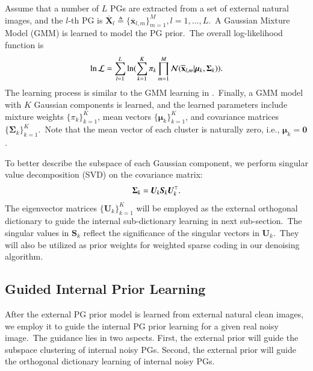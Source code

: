 Assume that a number of $L$ PGs are extracted from a set of external natural images, and the $l$-th PG is $\mathbf{\overline{X}}_{l}\triangleq \{\mathbf{\overline{x}}_{l,m}\}_{m=1}^{M}, l=1,...,L$.\ A Gaussian Mixture Model (GMM) is learned to model the PG prior.\ The overall log-likelihood function is
\vspace{-2mm}
\begin{equation}\label{equ3-1}
\vspace{-2mm}
\begin{split}
\ln\mathcal{L}=\sum_{l=1}^{L} \ln(\sum_{k=1}^{K}\pi_{k}\prod_{m=1}^{M}\mathcal{N}(\mathbf{\overline{x}}_{l,m}|\bm{\mu}_{k},\bm{\Sigma}_{k})).
\end{split}
\end{equation}
The learning process is similar to the GMM learning in \cite{pgpd,epll}.\ Finally, a GMM model with $K$ Gaussian components is learned, and the learned parameters include mixture weights $\{\pi_{k}\}_{k=1}^{K}$, mean vectors $\{\bm{\mu}_{k}\}_{k=1}^{K}$, and covariance matrices $\{\bm{\Sigma}_{k}\}_{k=1}^{K}$.\ Note that the mean vector of each cluster is naturally zero, i.e., $\bm{\mu}_{k}=\bm{0}$.  

To better describe the subspace of each Gaussian component, we perform singular value decomposition (SVD) \cite{eckart1936approximation} on the covariance matrix:
\vspace{-2mm}
\begin{equation}\label{equ3-2}
\vspace{-2mm}
\bm{\Sigma}_{k}=\bm{U}_{k}\bm{S}_{k}\bm{U}_{k}^{\top}.
\end{equation}
The eigenvector matrices $\{\bm{U}_{k}\}_{k=1}^{K}$ will be employed as the external orthogonal dictionary to guide the internal sub-dictionary learning in next sub-section.\ The singular values in $\bm{S}_{k}$ reflect the significance of the singular vectors in $\bm{U}_{k}$.\ They  will also be utilized as prior weights for weighted sparse coding in our denoising algorithm.


\subsection{Guided Internal Prior Learning}

After the external PG prior model is learned from external natural clean images, we employ it to guide the internal PG prior learning for a given real noisy image.\ The guidance lies in two aspects. First, the external prior will guide the subspace clustering of internal noisy PGs. Second, the external prior will guide the orthogonal dictionary learning of internal noisy PGs.

